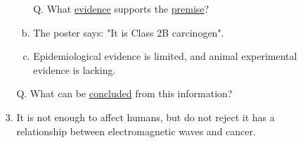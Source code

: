 \documentclass[a4paper, 12pt]{article}
\begin{document}
\begin{CJK*}{UTF8}{bsmi}
\begin{enumerate}[I.]
\begin{enumerate}[A.]
\begin{enumerate}[1.]
\begin{enumerate}[a.]
                                                \item [Q.] What \underline{evidence} supports the \underline{premise}?
                                                \item The poster says: "It is Class 2B carcinogen". \parencite{mp109151,iarc}
                                                \item Epidemiological evidence is limited, and animal experimental evidence is lacking. \parencite{nhri}
                                          \end{enumerate}
                                    \item [Q.] What can be \underline{concluded} from this information?
                                    \item It is not enough to affect humans, but do not reject it has a relationship between electromagnetic waves and cancer.
                              \end{enumerate}
                  \end{enumerate}


\end{enumerate}
\end{CJK*}
\end{document}

